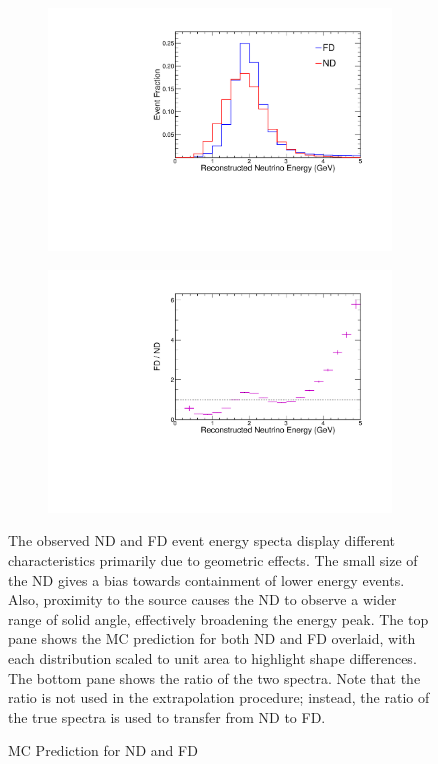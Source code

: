 \begin{figure}
\begin{center}
  \begin{subfigure}[b]{0.8\textwidth}
    \centering
    \includegraphics[width=\textwidth]{figures/plots/extrap/fd_nd_spec.pdf}
  \end{subfigure}

  \begin{subfigure}[b]{0.8\textwidth}
    \centering
    \includegraphics[width=\textwidth]{figures/plots/extrap/fd_nd_ratio.pdf}
  \end{subfigure}

\end{center}
\caption{MC Prediction for ND and FD}{
The observed ND and FD event energy specta display different characteristics
primarily due to geometric effects.
The small size of the ND gives a bias towards containment of lower energy events.
Also, proximity to the \numi source causes the ND to observe a wider
range of solid angle, effectively broadening the energy peak.
The top pane shows the MC prediction for both ND and FD overlaid, with each
distribution scaled to unit area to highlight shape differences.
The bottom pane shows the ratio of the two spectra.
Note that the ratio is not used in the extrapolation procedure; instead,
the ratio of the true spectra is used to transfer from ND to FD.
}
\label{ratioNDFD}
\end{figure}

